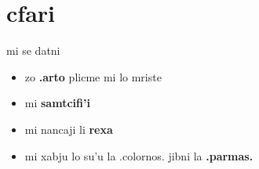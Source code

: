 {    \section{cfari}
    \begin{frame}{mi se datni}
        \begin{itemize}
            \item zo \textbf{.arto} plicme mi lo mriste
            \item mi \textbf{samtcifi'i}
            \item mi nancaji li \textbf{rexa}
            \item mi xabju lo su'u la .colornos. jibni la \textbf{.parmas.}
        \end{itemize}
    \end{frame}
}
